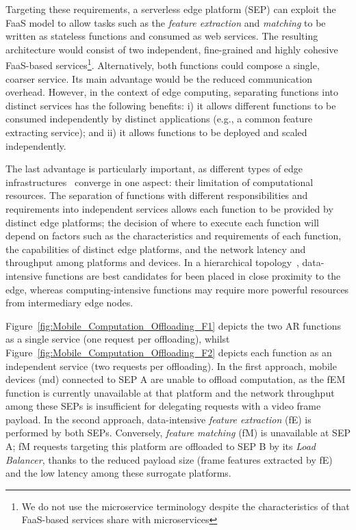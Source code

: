 Targeting these requirements, a serverless edge platform (SEP) can exploit the FaaS model to allow tasks such as the \textit{feature extraction} and \textit{matching} to be written as stateless functions and consumed as web services. The resulting architecture would consist of two independent, fine-grained and highly cohesive FaaS-based services\footnote{We do not use the microservice terminology despite the characteristics of that FaaS-based services share with microservices}. Alternatively, both functions could compose a single, coarser service. Its main advantage would be the reduced communication overhead. However, in the context of edge computing, separating functions into distinct services has the following benefits: i) it allows different functions to be consumed independently by distinct applications (e.g., a common feature extracting service); and ii) it allows functions to be deployed and scaled independently.%

The last advantage is particularly important, as different types of edge infrastructures~\cite{Satyanarayanan:2009,Taleb:2013,Liu:2014,K.Wang:2015} converge in one aspect: their limitation of computational resources. The separation of functions with different responsibilities and requirements into independent services allows each function to be provided by distinct edge platforms; the decision of where to execute each function will depend on factors such as the characteristics and requirements of each function, the capabilities of distinct edge platforms, and the network latency and throughput among platforms and devices. In a hierarchical topology~\cite{Liu:2014}, data-intensive functions are best candidates for been placed in close proximity to the edge, whereas computing-intensive functions may require more powerful resources from intermediary edge nodes. 

Figure~\ref{fig:Mobile_Computation_Offloading_F1} depicts the two AR functions as a single service (one request per offloading), whilst Figure~\ref{fig:Mobile_Computation_Offloading_F2} depicts each function as an independent service (two requests per offloading). 
In the first approach, mobile devices (md) connected to SEP A are unable to offload computation, as the fEM function is currently unavailable at that platform and the network throughput among these SEPs is insufficient for delegating requests with a video frame payload.
In the second approach, data-intensive \textit{feature extraction} (fE) is performed by both SEPs. Conversely, \textit{feature matching} (fM) is unavailable at SEP A; fM requests targeting this platform are offloaded to SEP B by its \textit{Load Balancer},
thanks to the reduced payload size (frame features extracted by fE) and the low latency among these surrogate platforms. 



